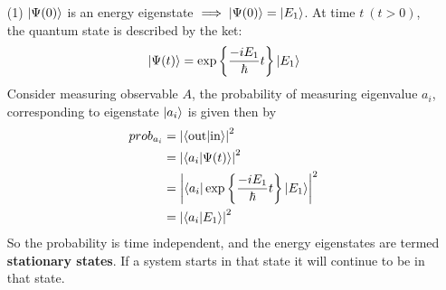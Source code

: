 \documentclass[english, 11pt]{article}
\begin{document}
    \begin{itemize}
      \item[(1)] $\left|\Psi(0)\right\rangle$ is an energy eigenstate $\implies \left|\Psi(0)\right\rangle = \left|E_1\right\rangle$. At time $t \ (t > 0)$, the quantum state is described by the ket:
      \[ \left|\Psi(t)\right\rangle = \exp \left\{ \frac{-iE_1}{\hbar} t \right\}\left|E_1\right\rangle \]
      Consider measuring observable $A$, the probability of measuring eigenvalue $a_i$, corresponding to eigenstate $\left|a_i\right\rangle$ is given then by
      \begin{align*}
         prob_{a_i} & = \left| \braket{\mbox{out}}{\mbox{in}} \right|^2 \\
                    & = \left| \braket{a_i}{\Psi(t)} \right|^2 \\
                    & = \left| \bra{a_i}{\expo{\f{-iE_1}{\hbar} t}\ket{E_1}} \right|^2 \\
                    & = \left| \braket{a_i}{E_1} \right|^2
      \end{align*}
      So the probability is time independent, and the energy eigenstates are termed \textbf{stationary states}. If a system starts in that state it will continue to be in that state.


\end{itemize}
\end{document}
